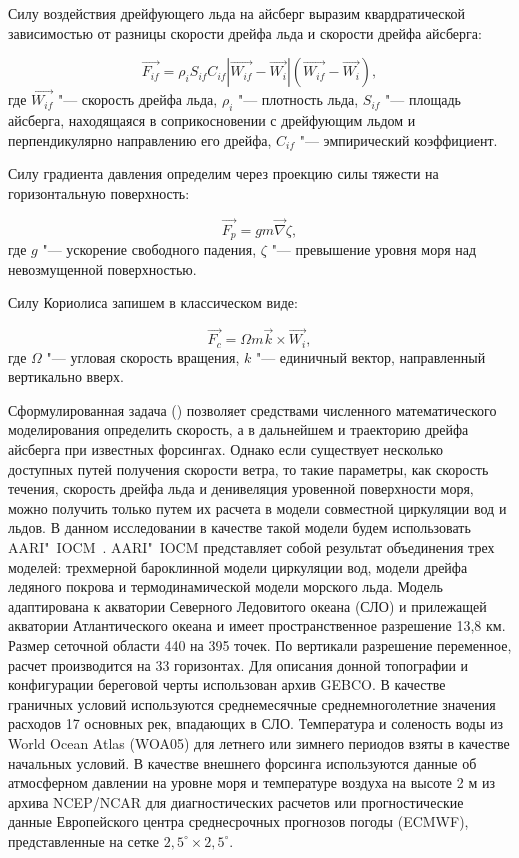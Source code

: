 Силу воздействия дрейфующего льда на айсберг выразим квардратической зависимостью от разницы скорости дрейфа льда и скорости дрейфа айсберга:

\begin{equation}
\label{eq:equation4_4}
\vec{F_{if}} = \rho_{i}S_{if}C_{if}\left|{\vec{W_{if}}-\vec{W_i}}\right|\left({\vec{W_{if}}-\vec{W_i}}\right),
\end{equation}
где $\vec{W_{if}}$ "--- скорость дрейфа льда, $\rho_{i}$ "--- плотность льда, $S_{if}$ "--- площадь айсберга, находящаяся в соприкосновении с дрейфующим льдом и перпендикулярно направлению его дрейфа, $C_{if}$ "---  эмпирический коэффициент.

Силу градиента давления определим через проекцию силы тяжести на горизонтальную поверхность:

\begin{equation}
\label{eq:equation4_5}
\vec{F_{p}} = gm\vec{\nabla}\zeta,
\end{equation}
где $g$ "--- ускорение свободного падения, $\zeta$ "--- превышение уровня моря над невозмущенной поверхностью.

Силу Кориолиса запишем в классическом виде:

\begin{equation}
\label{eq:equation4_6}
\vec{F_{c}} = \Omega m\vec{k}\times \vec{W_i},
\end{equation}
где $\Omega$ "--- угловая скорость вращения, $k$ "--- единичный вектор, направленный вертикально вверх.

Сформулированная задача () позволяет средствами численного математического моделирования определить скорость, а в дальнейшем и траекторию дрейфа айсберга при известных форсингах. Однако если существует несколько доступных путей получения скорости ветра, то такие параметры, как скорость течения, скорость дрейфа льда и денивеляция уровенной поверхности моря, можно получить только путем их расчета в модели совместной циркуляции вод и льдов. В данном исследовании в качестве такой модели будем использовать AARI"~IOCM~\cite{Kulakov2012}. AARI"~IOCM представляет собой результат объединения трех моделей: трехмерной бароклинной модели циркуляции вод, модели дрейфа ледяного покрова и термодинамической модели морского льда. Модель адаптирована к акватории Северного Ледовитого океана (СЛО) и прилежащей акватории Атлантического океана и имеет пространственное разрешение 13,8 км. Размер сеточной области 440 на 395 точек. По вертикали разрешение переменное, расчет производится на 33 горизонтах. Для описания донной топографии и конфигурации береговой черты использован архив GEBCO. В качестве граничных условий используются среднемесячные среднемноголетние значения расходов 17 основных рек, впадающих в СЛО. Температура и соленость воды из World Ocean Atlas (WOA05) для летнего или зимнего периодов взяты в качестве начальных условий. В качестве внешнего форсинга используются данные об атмосферном давлении на уровне моря и температуре воздуха на высоте 2 м из архива NCEP/NCAR для диагностических расчетов или прогностические данные Европейского центра среднесрочных прогнозов погоды (ECMWF), представленные на сетке $2,5^\circ \times 2,5^\circ$.

